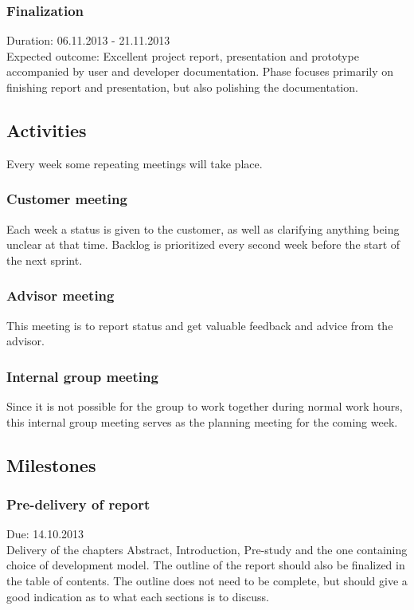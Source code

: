 \documentclass[11pt]{book}
\begin{document}
\subsubsection{Finalization}
Duration: 06.11.2013 - 21.11.2013\\
Expected outcome: Excellent project report, presentation and prototype accompanied by user and developer documentation. Phase focuses primarily on finishing report and presentation, but also polishing the documentation.

\subsection{Activities}
Every week some repeating meetings will take place.

\subsubsection{Customer meeting}
Each week a status is given to the customer, as well as clarifying anything being unclear at that time. Backlog is prioritized every second week before the start of the next sprint.

\subsubsection{Advisor meeting}
This meeting is to report status and get valuable feedback and advice from the advisor.

\subsubsection{Internal group meeting}
Since it is not possible for the group to work together during normal work hours, this internal group meeting serves as the planning meeting for the coming week.

\subsection{Milestones}

\subsubsection{Pre-delivery of report}
Due: 14.10.2013\\
Delivery of the chapters Abstract, Introduction, Pre-study and the one containing choice of development model. The outline of the report should also be finalized in the table of contents. The outline does not need to be complete, but should give a good indication as to what each sections is to discuss.
\end{document}
